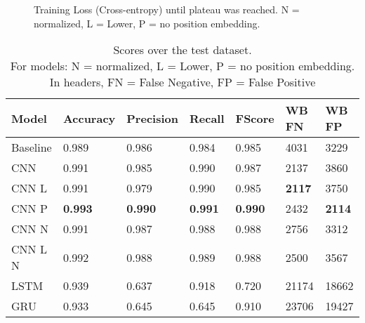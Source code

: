 \documentclass{jdmdh}
\begin{document}
\begin{figure}[!ht]
  \begin{center}
    \caption{Training Loss (Cross-entropy) until plateau was reached. N = normalized, L = Lower, P = no position embedding.}
  \label{fig:loss}
  \end{center}
\end{figure}

\begin{table}[!ht]
\centering
\begin{tabular}{lllllll}
\hline
Model    & Accuracy & Precision & Recall & FScore & WB FN & WB FP \\ \hline
Baseline & 0.989    & 0.986     & 0.984  & 0.985 & 4031 & 3229 \\
CNN      & 0.991    & 0.985     & 0.990  & 0.987 & 2137 & 3860 \\
CNN L    & 0.991    & 0.979     & 0.990  & 0.985 & \textbf{2117} & 3750 \\
CNN P    & \textbf{0.993}    & \textbf{0.990}& \textbf{0.991}  & \textbf{0.990} & 2432 & \textbf{2114} \\
CNN N    & 0.991    & 0.987     & 0.988  & 0.988 & 2756 & 3312 \\
CNN L N  & 0.992    & 0.988     & 0.989  & 0.988 & 2500 & 3567 \\
LSTM     & 0.939    & 0.637     & 0.918  & 0.720 & 21174 & 18662 \\
GRU     & 0.933    & 0.645     & 0.645  & 0.910 & 23706 & 19427 \\ \hline
\end{tabular}
\caption{Scores over the test dataset. \\\hspace{\textwidth}For models: N = normalized, L = Lower, P = no position embedding. \\\hspace{\textwidth}In headers, FN = False Negative, FP = False Positive}
\label{tab:scores}
\end{table}
\end{document}
